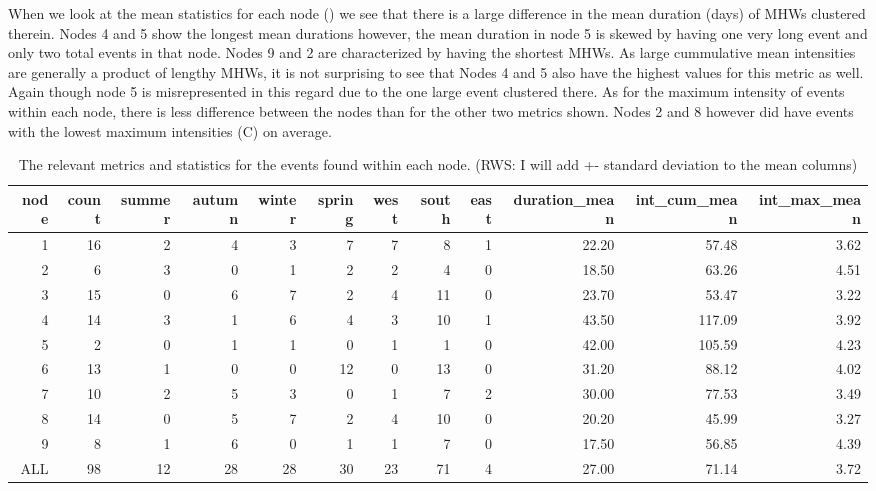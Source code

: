\documentclass[a4paper,10pt,review]{elsarticle}
\begin{document}
When we look at the mean statistics for each node () we see that there is a large difference in the mean duration (days) of MHWs clustered therein. Nodes 4 and 5 show the longest mean durations however, the mean duration in node 5 is skewed by having one very long event and only two total events in that node. Nodes 9 and 2 are characterized by having the shortest MHWs. As large cummulative mean intensities are generally a product of lengthy MHWs, it is not surprising to see that Nodes 4 and 5 also have the highest values for this metric as well. Again though node 5 is misrepresented in this regard due to the one large event clustered there. As for the maximum intensity of events within each node, there is less difference between the nodes than for the other two metrics shown. Nodes 2 and 8 however did have events with the lowest maximum intensities (\degree C) on average.

\begin{table}[ht]
\caption{\small The relevant metrics and statistics for the events found within each node. (RWS: I will add +- standard deviation to the mean columns)}
\label{table2}
\centering
\tiny
\begin{tabular}{rrrrrrrrrrrr}
  \toprule
node & count & summer & autumn & winter & spring & west & south & east & duration\_mean & int\_cum\_mean & int\_max\_mean \\ 
  \midrule
1 &  16 &   2 &   4 &   3 &   7 &   7 &   8 &   1 & 22.20 & 57.48 & 3.62 \\ 
  2 &   6 &   3 &   0 &   1 &   2 &   2 &   4 &   0 & 18.50 & 63.26 & 4.51 \\ 
  3 &  15 &   0 &   6 &   7 &   2 &   4 &  11 &   0 & 23.70 & 53.47 & 3.22 \\ 
  4 &  14 &   3 &   1 &   6 &   4 &   3 &  10 &   1 & 43.50 & 117.09 & 3.92 \\ 
  5 &   2 &   0 &   1 &   1 &   0 &   1 &   1 &   0 & 42.00 & 105.59 & 4.23 \\ 
  6 &  13 &   1 &   0 &   0 &  12 &   0 &  13 &   0 & 31.20 & 88.12 & 4.02 \\ 
  7 &  10 &   2 &   5 &   3 &   0 &   1 &   7 &   2 & 30.00 & 77.53 & 3.49 \\ 
  8 &  14 &   0 &   5 &   7 &   2 &   4 &  10 &   0 & 20.20 & 45.99 & 3.27 \\ 
  9 &   8 &   1 &   6 &   0 &   1 &   1 &   7 &   0 & 17.50 & 56.85 & 4.39 \\ 
  ALL &  98 &  12 &  28 &  28 &  30 &  23 &  71 &   4 & 27.00 & 71.14 & 3.72 \\ 
  \bottomrule
  \end{tabular}
\end{table}
\end{document}
